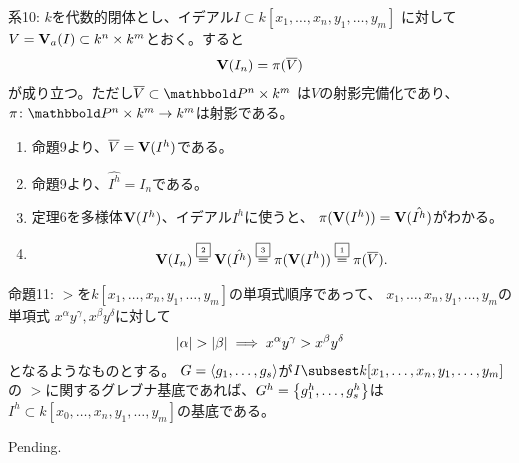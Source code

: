 \begin{framed}
  系10:
  $k$を代数的閉体とし、イデアル$I\subset k[x_1,\dots,x_n,y_1,\dots,y_m]$
  に対して$V=\textbf V_a(I)\subset k^n \times k^m$とおく。すると
  \begin{align}
    \textbf V(I_n) = \pi(\overline V)
  \end{align}
  が成り立つ。ただし$\overline V \subset \P^n \times k^m$
  は$V$の射影完備化であり、$\pi\colon \P^n \times k^m \to k^m$は射影である。
\end{framed}
\begin{myproof}
  \begin{enumerate}
    \item 命題9より、$\overline V = \textbf V(I^h)$である。
    \item
    命題9より、$\hat{I^h} = I_n$である。
    \item
    定理6を多様体$\textbf V(I^h)$、イデアル$I^h$に使うと、
    $\pi(\textbf V(I^h)) = \textbf V(\hat{I^h})$がわかる。
    \item
    \begin{align}
      \textbf V(I_n)
      \overset{\text{\fbox{\tiny 2}}}{=}
      \textbf V(\hat{I^h})
      \overset{\text{\fbox{\tiny 3}}}{=}
      \pi(\textbf V(I^h))
      \overset{\text{\fbox{\tiny 1}}}{=}
      \pi(\overline V).
    \end{align}
  \end{enumerate}
\end{myproof}

\begin{framed}
  命題11:
  $>$を$k[x_1,\dots,x_n,y_1,\dots,y_m]$の単項式順序であって、
  $x_1,\dots,x_n,y_1,\dots,y_m$の単項式
  $x^\alpha y^\gamma, x^\beta y^\delta $に対して
  \begin{align}
    \left|\alpha\right| > \left|\beta\right| \implies
    x^\alpha y^\gamma > x^\beta y^\delta
  \end{align}
  となるようなものとする。
  $G=\left\langle g_1,\dots,g_s \right\rangle$が$I\subsest k[x_1,\dots,x_n,y_1,\dots,y_m]$の
  $>$に関するグレブナ基底であれば、$G^h = \left\{g_1^h,\dots,g_s^h\right\}$は
  $I^h \subset k[x_0,\dots,x_n,y_1,\dots,y_m]$の基底である。
\end{framed}
\begin{myproof}
  Pending.
\end{myproof}

